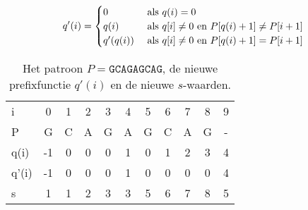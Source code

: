 \begin{itemize}
    $$q'(i) = \begin{cases}
        0 & \hbox{ als } q(i) = 0  \\
        q(i) & \hbox{ als } q[i] \neq 0 \hbox{ en } P[q(i) + 1] \neq P[i + 1] \\
        q'(q(i)) & \hbox{ als } q[i] \neq 0 \hbox{ en } P[q(i) + 1] = P[i + 1] \\
    \end{cases}$$
    \begin{table}[ht]
        \centering
        \begin{tabular}{l | c c c c c c c c c c}
            i   & 0 & 1 & 2 & 3 & 4 & 5 & 6 & 7 & 8 & 9\\
            P   & G & C & A & G & A & G & C & A & G & - \\
                \hline
            q(i) & -1 & 0 & 0 & 0 & 1 & 0 & 1 & 2 & 3 & 4 \\
            q'(i) & -1 & 0 & 0 & 0 & 1 & 0 & 0 & 0 & 0 & 4 \\
            s   & 1 & 1 & 2 & 3 & 3 & 5 & 6 & 7 & 8 & 5
        \end{tabular}
        \caption{Het patroon $P = \texttt{GCAGAGCAG}$, de nieuwe prefixfunctie $q'(i)$ en de nieuwe $s$-waarden.}
        \label{table:kmp2}
    \end{table}

    \begin{table}[ht]
        \centering   
        \caption{De tweede versie van het Knuth-Morris-Prattalgoritme, waarbij $s = i - q'(i)$.}
        \label{table:kmpex1}
    \end{table}


\end{itemize}
